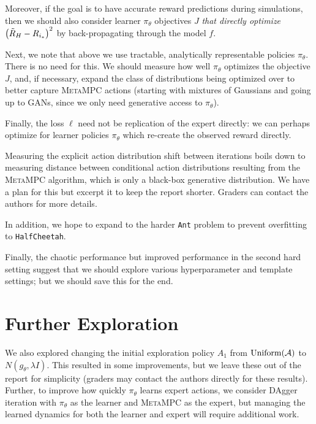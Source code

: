\documentclass{article}
\begin{document}
Moreover, if the goal is to have accurate reward predictions during simulations, then we should also consider learner $\pi_\theta$ objectives $J$ \textit{that directly optimize} $\left({\tilde{R}_H-R_{i_*}}\right)^2$ by back-propagating through the model $f$. 

Next, we note that above we use tractable, analytically representable policies $\pi_\theta$. There is no need for this. We should measure how well $\pi_\theta$ optimizes the objective $J$, and, if necessary, expand the class of distributions being optimized over to better capture \textsc{MetaMPC} actions (starting with mixtures of Gaussians and going up to GANs, since we only need generative access to $\pi_\theta$).

Finally, the loss $\ell$ need not be replication of the expert directly: we can perhaps optimize for learner policies $\pi_\theta$ which re-create the observed reward directly.

Measuring the explicit action distribution shift between iterations boils down to measuring distance between conditional action distributions resulting from the \textsc{MetaMPC} algorithm, which is only a black-box generative distribution. We have a plan for this but excerpt it to keep the report shorter. Graders can contact the authors for more details.

In addition, we hope to expand to the harder \texttt{Ant} problem to prevent overfitting to \texttt{HalfCheetah}.

Finally, the chaotic performance but improved performance in the second hard setting suggest that we should explore various hyperparameter and template settings; but we should save this for the end.

\section{Further Exploration}

We also explored changing the initial exploration policy $A_1$ from $\operatorname{Uniform}(\mathcal{A})$ to $N(g_\theta, \lambda I)$. This resulted in some improvements, but we leave these out of the report for simplicity (graders may contact the authors directly for these results). Further, to improve how quickly $\pi_\theta$ learns expert actions, we consider DAgger iteration with $\pi_\theta$ as the learner and \textsc{MetaMPC} as the expert, but managing the learned dynamics for both the learner and expert will require additional work.
\end{document}
